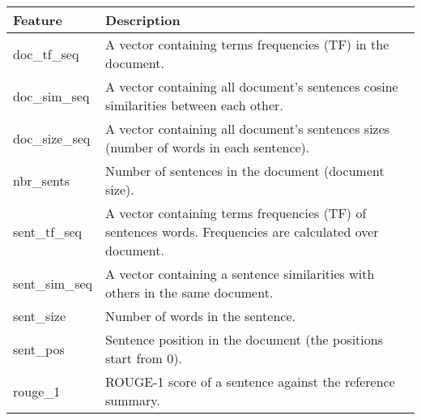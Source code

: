 \begin{tabular}{p{}p{}}

\hline\hline
Feature & Description  \\
\hline\hline

doc\_tf\_seq & 
A vector containing terms frequencies (TF) in the document.  
\\

doc\_sim\_seq & 
A vector containing all document's sentences cosine similarities between each other.  
\\

doc\_size\_seq & 
A vector containing all document's sentences sizes (number of words in each sentence).  
\\

nbr\_sents & 
Number of sentences in the document (document size).  
\\

\hline

sent\_tf\_seq & 
A vector containing terms frequencies (TF) of sentences words. Frequencies are calculated over document.
\\

sent\_sim\_seq & 
A vector containing a sentence similarities with others in the same document.  
\\

sent\_size & 
Number of words in the sentence.  
\\

sent\_pos & 
Sentence position in the document (the positions start from 0).  
\\

\hline

rouge\_1 & 
ROUGE-1 score of a sentence against the reference summary.  
\\

\hline\hline
\end{tabular} 
